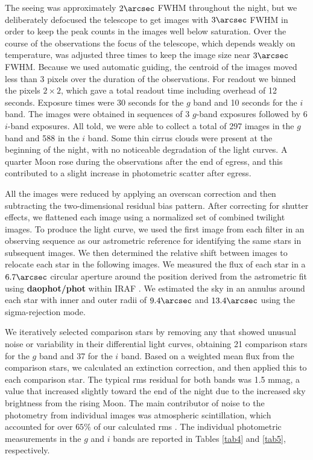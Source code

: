 \documentclass[12pt, preprint]{aastex}
\begin{document}
The seeing was approximately $2 \arcsec$ FWHM throughout the night,
but we deliberately defocused the telescope to get images with $3
\arcsec$ FWHM in order to keep the peak counts in the images well
below saturation. Over the course of the observations the focus of
the telescope, which depends weakly on temperature, was adjusted three
times to keep the image size near $3 \arcsec$ FWHM. Because we used
automatic guiding, the centroid of the images moved less than 3 pixels
over the duration of the observations. For readout we binned the pixels
$2\times2$, which gave a total readout time including overhead of 12
seconds. Exposure times were 30 seconds for the $g$ band and 10 seconds
for the $i$ band. The images were obtained in sequences of 3 $g$-band
exposures followed by 6 $i$-band exposures. All told, we were able to
collect a total of 297 images in the $g$ band and 588 in the $i$ band.
Some thin cirrus clouds were present at the beginning of the night,
with no noticeable degradation of the light curves. A quarter Moon
rose during the observations after the end of egress, and this
contributed to a slight increase in photometric scatter after egress.

All the images were reduced by applying an overscan correction and
then subtracting the two-dimensional residual bias pattern. After
correcting for shutter effects, we flattened each image using a
normalized set of combined twilight images. To produce the light
curve, we used the first image from each filter in an observing
sequence as our astrometric reference for identifying the same stars
in subsequent images. We then determined the relative shift between
images to relocate each star in the following images. We measured the
flux of each star in a $6.7 \arcsec$ circular aperture around the
position derived from the astrometric fit using {\bf daophot/phot} within
IRAF \citep{tody1986,tody1993}. We estimated the sky in an annulus
around each star with inner and outer radii of $9.4 \arcsec$ and $13.4
\arcsec$ using the sigma-rejection mode.

We iteratively selected comparison stars by removing any that showed
unusual noise or variability in their differential light curves,
obtaining 21 comparison stars for the $g$ band and 37 for the $i$
band. Based on a weighted mean flux from the comparison stars, we
calculated an extinction correction, and then applied this to each
comparison star. The typical rms residual for both bands was 1.5 mmag,
a value that increased slightly toward the end of the night due to the
increased sky brightness from the rising Moon. The main contributor of
noise to the photometry from individual images was atmospheric
scintillation, which accounted for over $65\%$ of our calculated rms
\citep{young1967}. The individual photometric measurements in the $g$ and 
$i$ bands are reported in Tables \ref{tab4} and \ref{tab5}, respectively.
\end{document}
